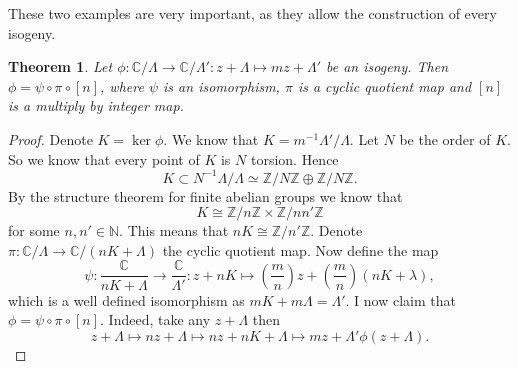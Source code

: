 \documentclass[a4paper]{article}
\theoremstyle{theoremdd}
\newtheorem{theorem}{Theorem}[section]
\theoremstyle{definitiondd}
\theoremstyle{remarkdd}
\newcommand{\N}{\mathbb{N}}
\newcommand{\Z}{\mathbb{Z}}
\newcommand{\C}{\mathbb{C}}
\begin{document}
These two examples are very important, as they allow the construction of every isogeny. 
\begin{theorem}
	Let $\phi: \C / \Lambda \to \C / \Lambda': z + \Lambda \mapsto mz + \Lambda'$ be an isogeny. Then $\phi = \psi \circ \pi \circ [n]$, where  $\psi$ is an isomorphism, $\pi$ is a cyclic quotient map and $[n]$ is a multiply by integer map.
\end{theorem}
\begin{proof}
	Denote $K = \ker \phi$. We know that $K = m^{-1} \Lambda' / \Lambda$.
	Let $N$ be the order of $K$. So we know that every point of $K$ is $N$ torsion. 
	Hence \[
		K \subset N^{-1} \Lambda / \Lambda \simeq \Z / N \Z \oplus \Z / N \Z. 
	\]
	By the structure theorem for finite abelian groups we know that  \[
	K \cong \Z / n \Z \times \Z / n n' \Z
	\]
	for some $n, n'\in \N$. 
	This means that $nK \cong \Z / n' \Z$. Denote $\pi: \C / \Lambda \to \C / (nK + \Lambda)$ the cyclic quotient map. Now define the map \[
		\psi: \frac{\C}{nK + \Lambda} \to \frac{\C}{\Lambda'}: z + nK \mapsto  \left(\frac{m}{n}\right) z + \left( \frac{m}{n} \right)(nK + \lambda)
	,\] 
	which is a well defined isomorphism as $mK + m\Lambda = \Lambda'$. 
	I now claim that $\phi = \psi \circ \pi \circ [n]$. Indeed, take any $z + \Lambda$ then \[
		z + \Lambda \mapsto nz + \Lambda \mapsto  nz + nK + \Lambda \mapsto  mz + \Lambda' \phi(z + \Lambda)
	.\]  
\end{proof}
\end{document}
